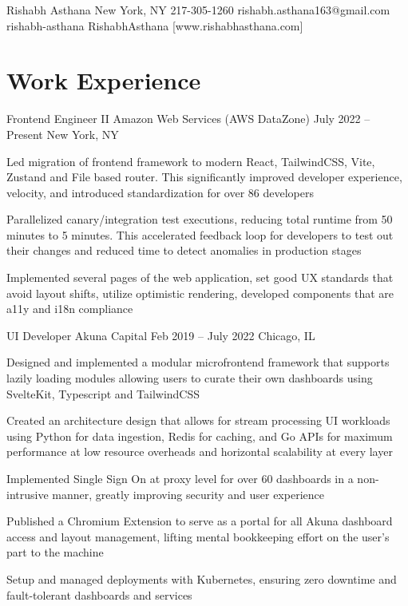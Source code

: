 \documentclass[letterpaper]{resume_config}
\begin{document}
\Header
    {Rishabh Asthana} %
    {New York, NY} %
    {217-305-1260} %
    {rishabh.asthana163@gmail.com} %
    {rishabh-asthana} %
    {RishabhAsthana} %
    [www.rishabhasthana.com] %


\section{Work Experience}

\WorkExperience
    {Frontend Engineer II} %
    {Amazon Web Services (AWS DataZone)} %
    {July 2022 -- Present} %
    {New York, NY} %
    {
        \item Led migration of frontend framework to modern React, TailwindCSS, Vite, Zustand and File based router. This significantly improved developer experience, velocity, and introduced standardization for over 86 developers
        \item Parallelized canary/integration test executions, reducing total runtime from 50 minutes to 5 minutes. This accelerated feedback loop for developers to test out their changes and reduced time to detect anomalies in production stages
        \item Implemented several pages of the web application, set good UX standards that avoid layout shifts, utilize optimistic rendering, developed components that are a11y and i18n compliance
    } 
    
\WorkExperience
    {UI Developer} %
    {Akuna Capital} %
    {Feb 2019 -- July 2022} %
    {Chicago, IL} %
    {
        \item Designed and implemented a modular microfrontend framework that supports lazily loading modules allowing users to curate their own dashboards using SvelteKit, Typescript and TailwindCSS
        \item Created an architecture design that allows for stream processing UI workloads using Python for data ingestion, Redis for caching, and Go APIs for maximum performance at low resource overheads and horizontal scalability at every layer
        \item Implemented Single Sign On at proxy level for over 60 dashboards in a non-intrusive manner, greatly improving security and user experience
        \item Published a Chromium Extension to serve as a portal for all Akuna dashboard access and layout management, lifting mental bookkeeping effort on the user's part to the machine
        \item Setup and managed deployments with Kubernetes, ensuring zero downtime and fault-tolerant dashboards and services
    } 
\end{document}
